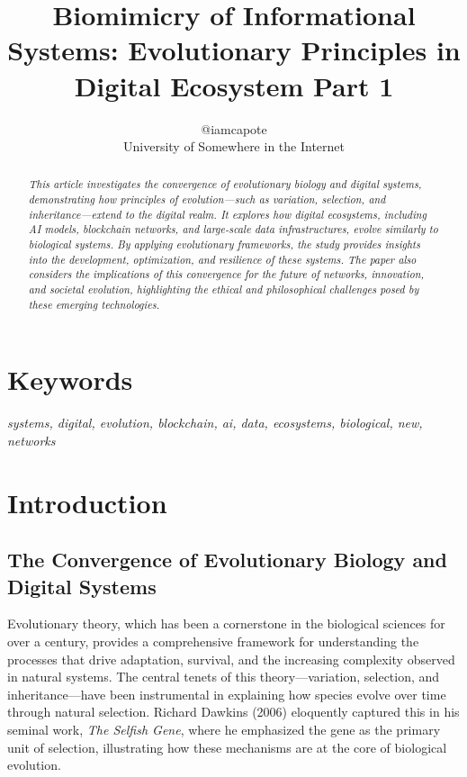 \documentclass[12pt,twoside]{article}
\begin{document}
\onecolumn
\title{Biomimicry of Informational Systems: Evolutionary Principles in Digital Ecosystem Part 1}
\author{@iamcapote \\ \small University of Somewhere in the Internet}
\date{\vspace{-5ex}} %
\maketitle
\tableofcontents
\newpage
\begin{abstract}
\noindent\textit{This article investigates the convergence of evolutionary biology and digital systems, demonstrating how principles of evolution—such as variation, selection, and inheritance—extend to the digital realm. It explores how digital ecosystems, including AI models, blockchain networks, and large-scale data infrastructures, evolve similarly to biological systems. By applying evolutionary frameworks, the study provides insights into the development, optimization, and resilience of these systems. The paper also considers the implications of this convergence for the future of networks, innovation, and societal evolution, highlighting the ethical and philosophical challenges posed by these emerging technologies.}
\end{abstract}

\section{Keywords}
\noindent\textit{systems, digital, evolution, blockchain, ai, data, ecosystems, biological, new, networks}

\newpage

\onecolumn
\section{Introduction}


\subsection{The Convergence of Evolutionary Biology and Digital Systems}

Evolutionary theory, which has been a cornerstone in the biological sciences for over a century, provides a comprehensive framework for understanding the processes that drive adaptation, survival, and the increasing complexity observed in natural systems. The central tenets of this theory—variation, selection, and inheritance—have been instrumental in explaining how species evolve over time through natural selection. Richard Dawkins (2006) eloquently captured this in his seminal work, \textit{The Selfish Gene}, where he emphasized the gene as the primary unit of selection, illustrating how these mechanisms are at the core of biological evolution.
\end{document}
